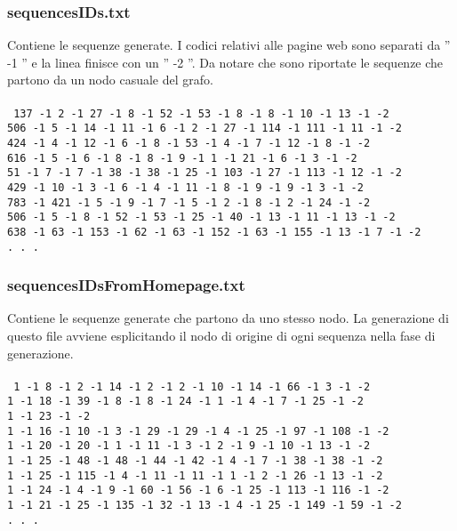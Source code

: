 \subsubsection{sequencesIDs.txt}
Contiene le sequenze generate. I codici relativi alle pagine web sono separati da '' -1 '' e la linea finisce con un '' -2 ''. Da notare che sono riportate le sequenze che partono da un nodo casuale del grafo.
\\\\
\texttt{
137 -1 2 -1 27 -1 8 -1 52 -1 53 -1 8 -1 8 -1 10 -1 13 -1 -2\\
506 -1 5 -1 14 -1 11 -1 6 -1 2 -1 27 -1 114 -1 111 -1 11 -1 -2\\
424 -1 4 -1 12 -1 6 -1 8 -1 53 -1 4 -1 7 -1 12 -1 8 -1 -2\\
616 -1 5 -1 6 -1 8 -1 8 -1 9 -1 1 -1 21 -1 6 -1 3 -1 -2\\
51 -1 7 -1 7 -1 38 -1 38 -1 25 -1 103 -1 27 -1 113 -1 12 -1 -2\\
429 -1 10 -1 3 -1 6 -1 4 -1 11 -1 8 -1 9 -1 9 -1 3 -1 -2\\
783 -1 421 -1 5 -1 9 -1 7 -1 5 -1 2 -1 8 -1 2 -1 24 -1 -2\\
506 -1 5 -1 8 -1 52 -1 53 -1 25 -1 40 -1 13 -1 11 -1 13 -1 -2\\
638 -1 63 -1 153 -1 62 -1 63 -1 152 -1 63 -1 155 -1 13 -1 7 -1 -2\\
. . .\\
}
\subsubsection{sequencesIDsFromHomepage.txt}
Contiene le sequenze generate che partono da uno stesso nodo. La generazione di questo file avviene esplicitando il nodo di origine di ogni sequenza nella fase di generazione.
\\\\
\texttt{
1 -1 8 -1 2 -1 14 -1 2 -1 2 -1 10 -1 14 -1 66 -1 3 -1 -2\\
1 -1 18 -1 39 -1 8 -1 8 -1 24 -1 1 -1 4 -1 7 -1 25 -1 -2\\
1 -1 23 -1 -2\\
1 -1 16 -1 10 -1 3 -1 29 -1 29 -1 4 -1 25 -1 97 -1 108 -1 -2\\
1 -1 20 -1 20 -1 1 -1 11 -1 3 -1 2 -1 9 -1 10 -1 13 -1 -2\\
1 -1 25 -1 48 -1 48 -1 44 -1 42 -1 4 -1 7 -1 38 -1 38 -1 -2\\
1 -1 25 -1 115 -1 4 -1 11 -1 11 -1 1 -1 2 -1 26 -1 13 -1 -2\\
1 -1 24 -1 4 -1 9 -1 60 -1 56 -1 6 -1 25 -1 113 -1 116 -1 -2\\
1 -1 21 -1 25 -1 135 -1 32 -1 13 -1 4 -1 25 -1 149 -1 59 -1 -2\\
. . .\\
}

